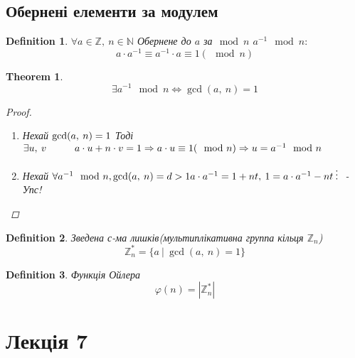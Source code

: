 \documentclass[a4paper,12pt]{bookest}
\newtheorem{theorem}{Theorem}[section]
\newtheorem{definition}{Definition}[section]
\newcommand\tab[1][1cm]{\hspace*{#1}}
\begin{document}
\section{Обернені елементи за модулем}
\begin{definition}
	$\forall a\in\mathbb{Z},\>n\in\mathbb{N}$ Обернене до $a$ за$\mod n$ $a^{-1}\mod n:$
	$$a\cdot a^{-1}\equiv a^{-1}\cdot a\equiv 1(\mod n)$$
\end{definition}
\begin{theorem}
	$$\exists a^{-1}\mod n\Leftrightarrow\gcd(a,\>n)=1$$
	\begin{proof}$ $
		\begin{enumerate}
			\item Нехай $\gcd(a,\>n)=1\\$ Тоді $\exists u,\>v\tab a\cdot u+n\cdot v=1\Rightarrow a\cdot u\equiv 1(\mod n)\Rightarrow u=a^{-1}\mod n$  
			\item Нехай $\forall a^{-1}\mod n, \gcd (a,\>n)=d>1\\ a\cdot a^{-1}=1+nt,\>1=a\cdot a^{-1}-nt \>\vdots\>$ - Упс! 
		\end{enumerate}
	\end{proof}
\end{theorem}
\begin{definition}
	Зведена с-ма лишків(мультиплікативна группа кільця $\mathbb{Z}_n$) 
	$$\mathbb{Z}_n^*=\{a\>|\>\gcd(a,\>n)=1\}$$
\end{definition}
\begin{definition}
	Функція Ойлера $$\varphi(n)=|\mathbb{Z}_n^*|$$
\end{definition}
\chapter{Лекція 7}
\end{document}
